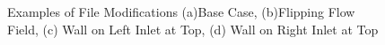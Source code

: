 \documentclass[12pt, oneside]{article}
\begin{document}
\begin{figure}[H]
\centering
{}

\caption{{\footnotesize Examples of File Modifications (a)Base Case, (b)Flipping Flow Field, (c) Wall on Left Inlet at Top, (d) Wall on Right Inlet at Top}}
\label{fig: } 
\end{figure}
\end{document}
